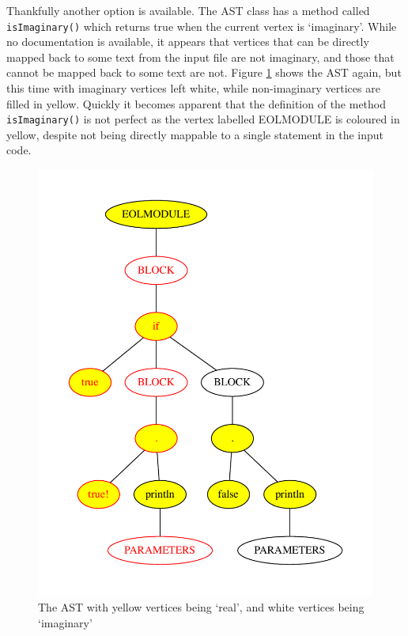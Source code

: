 Thankfully another option is available. The AST class has a method called \verb|isImaginary()| which returns true when the current vertex is `imaginary'. While no documentation is available, it appears that vertices that can be directly mapped back to some text from the input file are not imaginary, and those that cannot be mapped back to some text are not. Figure \ref{fig:ifElseASTreal} shows the AST again, but this time with imaginary vertices left white, while non-imaginary vertices are filled in yellow. Quickly it becomes apparent that the definition of the method \verb+isImaginary()+ is not perfect as the vertex labelled EOLMODULE is coloured in yellow, despite not being directly mappable to a single statement in the input code. 

\begin{figure}
	\centering
	\includegraphics[scale=0.5]{figures/ifElseRealAST.pdf}
	\caption{The AST with yellow vertices being `real', and white vertices being `imaginary'}
	\label{fig:ifElseASTreal}
\end{figure}

